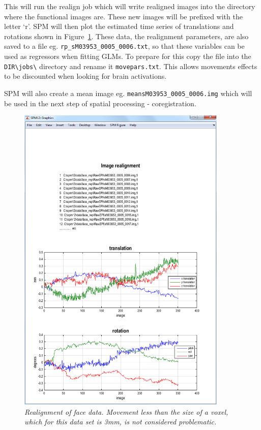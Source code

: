 This will run the realign job which will write realigned images into the directory where the functional images are. These new images will be prefixed with the letter `r'. SPM will then plot the estimated time series of translations and rotations shown in Figure~\ref{face_realign}. These data, the realignment parameters, are also saved to a file eg. \verb!rp_sM03953_0005_0006.txt!, so that these variables can be used as regressors when fitting GLMs. To prepare for this copy the file into the \verb!DIR\jobs\! directory and rename it \verb!movepars.txt!. This allows movements effects to be discounted when looking for brain activations.

SPM will also create a mean image eg. \verb!meansM03953_0005_0006.img! which will be used in the next step of spatial processing - coregistration.

\begin{figure}
\begin{center}
\includegraphics[width=100mm]{faces/realign}
\caption{\em Realignment of face data. Movement less than the size of a voxel, which for this data set is 3mm, is not considered problematic. \label{face_realign}}
\end{center}
\end{figure}

